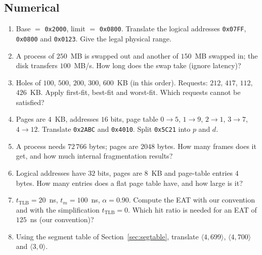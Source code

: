 \documentclass[11pt,a4paper]{article}
\begin{document}
\subsection*{Numerical}
\begin{enumerate}[leftmargin=1.6em,resume]
  \item Base $=$ \texttt{0x2000}, limit $=$ \texttt{0x0800}. Translate the logical addresses \texttt{0x07FF}, \texttt{0x0800} and \texttt{0x0123}. Give the legal physical range.
  \item A process of $250$~MB is swapped out and another of $150$~MB swapped in; the disk transfers $100$~MB/s. How long does the swap take (ignore latency)?
  \item Holes of $100$, $500$, $200$, $300$, $600$~KB (in this order). Requests: $212$, $417$, $112$, $426$~KB. Apply first-fit, best-fit and worst-fit. Which requests cannot be satisfied?
  \item Pages are $4$~KB, addresses $16$ bits, page table $0\to5$, $1\to9$, $2\to1$, $3\to7$, $4\to12$. Translate \texttt{0x2ABC} and \texttt{0x4010}. Split \texttt{0x5C21} into $p$ and $d$.
  \item A process needs $72\,766$ bytes; pages are $2048$ bytes. How many frames does it get, and how much internal fragmentation results?
  \item Logical addresses have $32$ bits, pages are $8$~KB and page-table entries $4$ bytes. How many entries does a flat page table have, and how large is it?
  \item $t_{\text{TLB}} = 20$~ns, $t_{m} = 100$~ns, $\alpha = 0.90$. Compute the EAT with our convention and with the simplification $t_{\text{TLB}} = 0$. Which hit ratio is needed for an EAT of $125$~ns (our convention)?
  \item Using the segment table of Section~\ref{sec:segtable}, translate $\langle 4, 699\rangle$, $\langle 4, 700\rangle$ and $\langle 3, 0\rangle$.
\end{enumerate}
\end{document}
